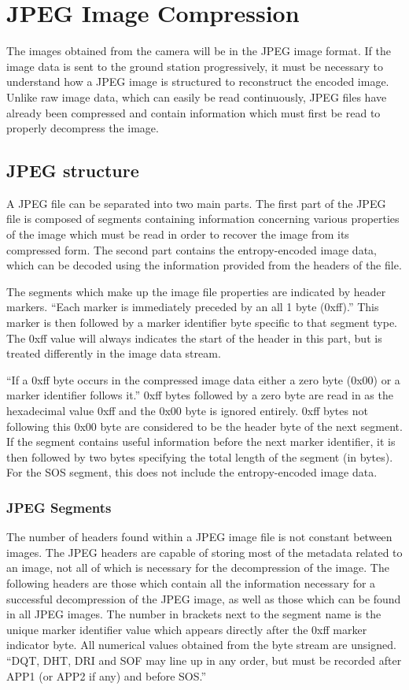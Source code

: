 
\section{JPEG Image Compression}
\label{jpeg_image_compression}
The images obtained from the camera will be in the JPEG image format. 
If the image data is sent to the ground station progressively, 
it must be necessary to understand how a JPEG image is structured to reconstruct the encoded image. 
Unlike raw image data, which can easily be read continuously, 
JPEG files have already been compressed and contain information which must first be read to properly decompress the image.

\subsection{JPEG structure}
A JPEG file can be separated into two main parts. 
The first part of the JPEG file is composed of segments containing information concerning 
various properties of the image which must be read in order to recover the image from its compressed form. 
The second part contains the entropy-encoded image data, which can be decoded using the information provided from the headers of the file.  

The segments which make up the image file properties are indicated by header markers. 
``Each marker is immediately preceded by an all 1 byte (0xff).'' \cite{jpeg_layout}
This marker is then followed by a marker identifier byte specific to that segment type. 
The 0xff value will always indicates the start of the header in this part, but is treated differently in the image data stream. 

``If a 0xff byte occurs in the compressed image data either a zero byte (0x00) or a marker identifier follows it.'' \cite{jpeg_layout} 
0xff bytes followed by a zero byte are read in as the hexadecimal value 0xff and the 0x00 byte is ignored entirely. 
0xff bytes not following this 0x00 byte are considered to be the header byte of the next segment. 
If the segment contains useful information before the next marker identifier, it is then followed by two bytes specifying the total length of the segment (in bytes). 
For the SOS segment, this does not include the entropy-encoded image data.

\subsubsection{JPEG Segments}
The number of headers found within a JPEG image file is not constant between images. 
The JPEG headers are capable of storing most of the metadata related to an image, not all of which is necessary for the decompression of the image. 
The following headers are those which contain all the information necessary for 
a successful decompression of the JPEG image, as well as those which can be found in all JPEG images. 
The number in brackets next to the segment name is the unique marker identifier value which appears directly after the 0xff marker indicator byte. 
All numerical values obtained from the byte stream are unsigned. 
``DQT, DHT, DRI and SOF may line up in any order, but must be recorded after APP1 (or APP2 if any) and before SOS.'' \cite{exif_std}

